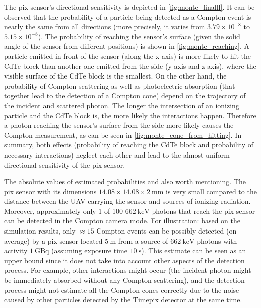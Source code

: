 The \ac{pix} sensor's directional sensitivity is depicted in \ref{fig:monte_finalll}.
It can be observed that the probability of a particle being detected as a Compton event is nearly the same from all directions (more precisely, it varies from $3.79 \times 10^{-8}$ to $5.15\times 10^{-8}$).
The probability of reaching the sensor's surface (given the solid angle of the sensor from different positions) is shown in \ref{fig:monte_reaching}.
A particle emitted in front of the sensor (along the x-axis) is more likely to hit the \ac{CdTe} block than another one emitted from the side (y-axis and z-axis), where the visible surface of the \ac{CdTe} block is the smallest.
On the other hand, the probability of Compton scattering as well as photoelectric absorption (that together lead to the detection of a Compton cone) depend on the trajectory of the incident and scattered photon.
The longer the intersection of an ionizing particle and the \ac{CdTe} block is, the more likely the interactions happen.
Therefore a photon reaching the sensor's surface from the side more likely causes the Compton measurement, as can be seen in \ref{fig:monte_cone_from_hitting}.
In summary, both effects (probability of reaching the \ac{CdTe} block and probability of necessary interactions) neglect each other and lead to the almost uniform directional sensitivity of the \ac{pix} sensor.

The absolute values of estimated probabilities and also worth mentioning.
The \ac{pix} sensor with its dimensions $14.08 \times 14.08 \times 2 \ \si{\milli\meter}$ is very small compared to the distance between the \ac{UAV} carrying the sensor and sources of ionizing radiation.
Moreover, approximately only 1 of 100 $\SI{662}{\kilo\electronvolt}$ photons that reach the \ac{pix} sensor can be detected in the Compton camera mode.
For illustration: based on the simulation results, only $\approx 15$ Compton events can be possibly detected (on average) by a \ac{pix} sensor located $\SI{5}{\meter}$ 
from a source of $\SI{662}{\kilo\electronvolt}$ photons  with activity $\SI{1}{\giga\becquerel}$
(assuming exposure time $\SI{10}{\second}$). 
This estimate can be seen as an upper bound since it does not take into account other aspects of the detection process.
For example, other interactions might occur (the incident photon might be immediately absorbed without any Compton scattering), and the detection process might not estimate all the Compton cones correctly due to the noise caused by other particles detected by the Timepix detector at the same time.


